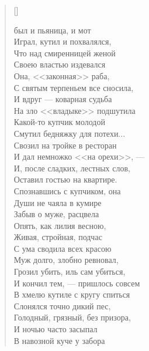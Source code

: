 \newpage

\vspace*{-2.5cm}


\settowidth{\versewidth}{\vinЧто над смиренницей женой}
\begin{verse}[\versewidth]
\begin{patverse*}
 был и пьяница, и мот\ldotst\\
Играл, кутил и похвалялся,\\
 Что над смиренницей женой\\
Своею властью издевался\ldotse\\
 Она, <<законная>> раба,\\
С святым терпеньем все сносила,\\
 И вдруг --- коварная судьба\\
На зло <<владыке>> подшутила\ldotse\\
Какой-то купчик молодой\\
Смутил бедняжку для потехи...\\
Свозил на тройке в ресторан\\
И дал немножко <<на орехи>>, ---\\
И, после сладких, лестных слов,\\
Оставил гостью на квартире.\\
Спознавшись с купчиком, она\\
Души не чаяла в кумире\ldotst\\
Забыв о муже, расцвела\\
Опять, как лилия весною,\\
Живая, стройная, подчас\\
С ума сводила всех красою\ldotst\\
Муж долго, злобно ревновал,\\
Грозил убить, иль сам убиться,\\
И кончил тем, --- пришлось совсем\\
В хмелю кутиле с кругу спиться\ldotst\\
Слонялся точно дикий пес,\\
Голодный, грязный, без призора,\\
И ночью часто засыпал\\
В навозной куче у забора\ldotst\\

\end{patverse*}
\end{verse}
